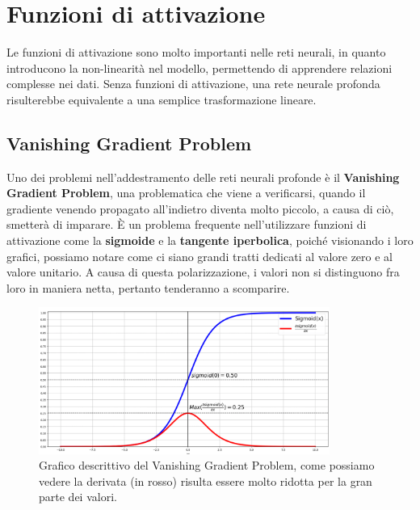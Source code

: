 \chapter{Funzioni di attivazione}\label{chpt:5}
Le funzioni di attivazione sono molto importanti nelle reti neurali, in quanto introducono la non-linearità nel modello, permettendo di apprendere relazioni complesse nei dati. Senza funzioni di attivazione, una rete neurale profonda risulterebbe equivalente a una semplice trasformazione lineare.

\section{Vanishing Gradient Problem}
Uno dei problemi nell'addestramento delle reti neurali profonde è il \textbf{Vanishing Gradient Problem}, una problematica che viene a verificarsi, quando il gradiente venendo propagato all'indietro diventa molto piccolo, a causa di ciò, smetterà di imparare. È un problema frequente nell'utilizzare funzioni di attivazione come la \textbf{sigmoide} e la \textbf{tangente iperbolica}, poiché visionando i loro grafici, possiamo notare come ci siano grandi tratti dedicati al valore zero e al valore unitario. A causa di questa polarizzazione, i valori non si distinguono fra loro in maniera netta, pertanto tenderanno a scomparire.

\begin{figure}[h]
    \centering
    \includegraphics[width=0.85\textwidth]{figure/VanishingGradientProblem.png}
    \caption{Grafico descrittivo del Vanishing Gradient Problem, come possiamo vedere la derivata (in rosso) risulta essere molto ridotta per la gran parte dei valori.}
\end{figure}

